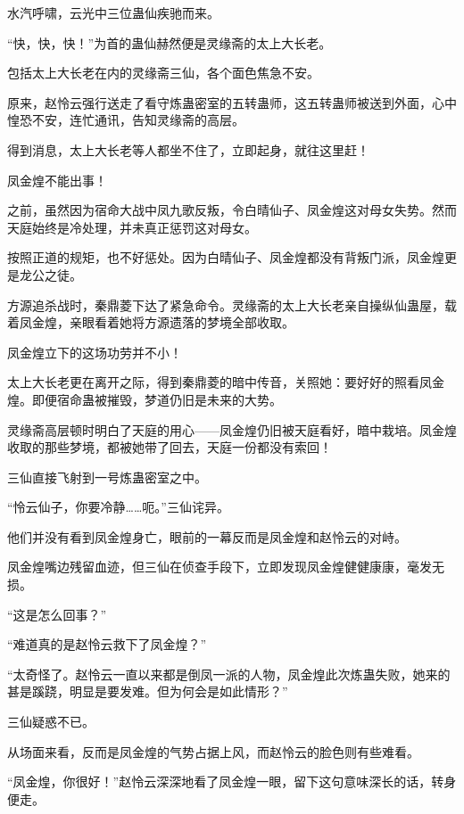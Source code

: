 
\begin{this_body}

水汽呼啸，云光中三位蛊仙疾驰而来。

“快，快，快！”为首的蛊仙赫然便是灵缘斋的太上大长老。

包括太上大长老在内的灵缘斋三仙，各个面色焦急不安。

原来，赵怜云强行送走了看守炼蛊密室的五转蛊师，这五转蛊师被送到外面，心中惶恐不安，连忙通讯，告知灵缘斋的高层。

得到消息，太上大长老等人都坐不住了，立即起身，就往这里赶！

凤金煌不能出事！

之前，虽然因为宿命大战中凤九歌反叛，令白晴仙子、凤金煌这对母女失势。然而天庭始终是冷处理，并未真正惩罚这对母女。

按照正道的规矩，也不好惩处。因为白晴仙子、凤金煌都没有背叛门派，凤金煌更是龙公之徒。

方源追杀战时，秦鼎菱下达了紧急命令。灵缘斋的太上大长老亲自操纵仙蛊屋，载着凤金煌，亲眼看着她将方源遗落的梦境全部收取。

凤金煌立下的这场功劳并不小！

太上大长老更在离开之际，得到秦鼎菱的暗中传音，关照她：要好好的照看凤金煌。即便宿命蛊被摧毁，梦道仍旧是未来的大势。

灵缘斋高层顿时明白了天庭的用心——凤金煌仍旧被天庭看好，暗中栽培。凤金煌收取的那些梦境，都被她带了回去，天庭一份都没有索回！

三仙直接飞射到一号炼蛊密室之中。

“怜云仙子，你要冷静……呃。”三仙诧异。

他们并没有看到凤金煌身亡，眼前的一幕反而是凤金煌和赵怜云的对峙。

凤金煌嘴边残留血迹，但三仙在侦查手段下，立即发现凤金煌健健康康，毫发无损。

“这是怎么回事？”

“难道真的是赵怜云救下了凤金煌？”

“太奇怪了。赵怜云一直以来都是倒凤一派的人物，凤金煌此次炼蛊失败，她来的甚是蹊跷，明显是要发难。但为何会是如此情形？”

三仙疑惑不已。

从场面来看，反而是凤金煌的气势占据上风，而赵怜云的脸色则有些难看。

“凤金煌，你很好！”赵怜云深深地看了凤金煌一眼，留下这句意味深长的话，转身便走。


\end{this_body}
